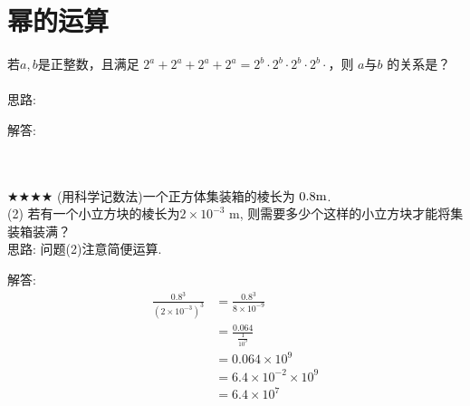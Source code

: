 \section{幂的运算}

\item {
    若$a,b$是正整数，且满足 $2^a + 2^a + 2^a + 2^a = 2^b\cdot 2^b\cdot 2^b\cdot 2^b\cdot$，则 $a$与$b$ 的关系是？\\
    \ifshowSolution
    \fangsong{}
    \\
    思路: 

    解答:
    \else
        \\ \\ \\
    \fi
}

\item {
    $\bigstar\bigstar\bigstar\bigstar$
    (用科学记数法)一个正方体集装箱的棱长为 $0. 8 \rm{m}$. \\
    (2) 若有一个小立方块的棱长为$2\times 10^{-3} $ m, 则需要多少个这样的小立方块才能将集装箱装满？
    \ifshowSolution
    \fangsong{}
    \\
    思路: 问题(2)注意简便运算. 

    解答:
    \begin{align*}
        \frac{0. 8^3} {(2\times 10^{-3})^3} &= \frac{0. 8^3} {8\times 10^{-9}}\\
        &= \frac{0. 064} {\frac{1}{10^9}}\\
        &= 0. 064\times 10^9\\
        &= 6. 4\times 10^{-2}\times 10^9\\
        &= 6. 4\times 10^7\\
    \end{align*}
    \else
        \\ \\ \\
    \fi
}


